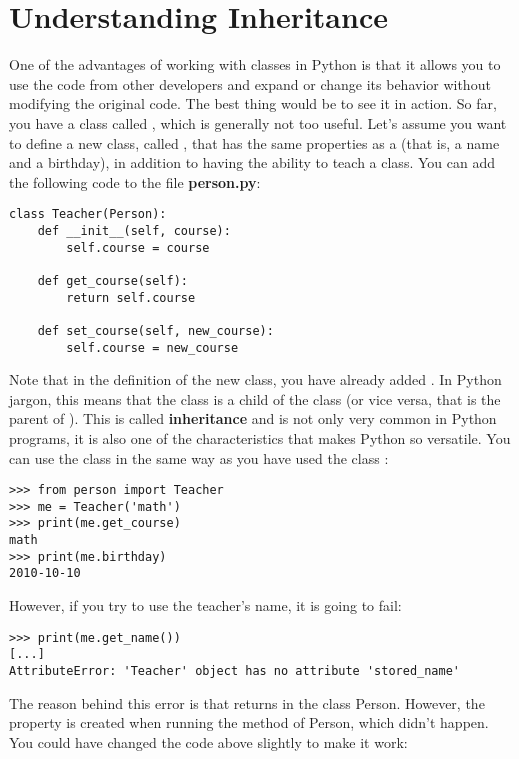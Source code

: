 \section{Understanding Inheritance}\label{sec:inheritance}
One of the advantages of working with classes in Python is that it allows you to use the code from other developers and expand or change its behavior without modifying the original code. The best thing would be to see it in action. So far, you have a class called , which is generally not too useful. Let's assume you want to define a new class, called , that has the same properties as a  (that is, a name and a birthday), in addition to having the ability to teach a class. You can add the following code to the file \textbf{person.py}:

\begin{verbatim}
class Teacher(Person):
    def __init__(self, course):
        self.course = course

    def get_course(self):
        return self.course

    def set_course(self, new_course):
        self.course = new_course
\end{verbatim}

Note that in the definition of the new  class, you have already added . In Python jargon, this means that the class  is a child of the class  (or vice versa, that  is the parent of ). This is called \textbf{inheritance} and is not only very common in Python programs, it is also one of the characteristics that makes Python so versatile. You can use the class  in the same way as you have used the class :

\begin{verbatim}
>>> from person import Teacher
>>> me = Teacher('math')
>>> print(me.get_course)
math
>>> print(me.birthday)
2010-10-10
\end{verbatim}

However, if you try to use the teacher's name, it is going to fail:

\begin{verbatim}
>>> print(me.get_name())
[...]
AttributeError: 'Teacher' object has no attribute 'stored_name'
\end{verbatim}

The reason behind this error is that  returns  in the class Person. However, the property  is created when running the  method of Person, which didn't happen. You could have changed the code above slightly to make it work:

